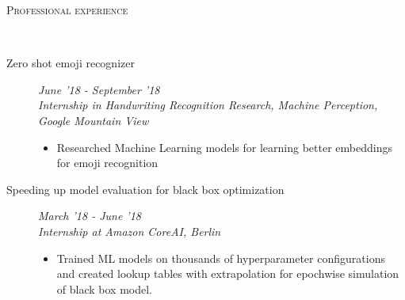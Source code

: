 \documentclass[9pt]{article}
\newenvironment{changemargin}[2]{%
  \begin{list}{}{%
      \setlength{\topsep}{0pt}%
    \setlength{\leftmargin}{#1}%
    \setlength{\rightmargin}{#2}%
    \setlength{\listparindent}{\parindent}%
  \setlength{\itemindent}{\parindent}%
    \setlength{\parsep}{\parskip}%
    }%
  \item[]}{\end{list}
    }
\newcommand{\lineover}{
  \begin{changemargin}{-0.05in}{-0.10in}
    \vspace*{-9pt}
    \hrulefill \\
    \vspace*{-2pt}
  \end{changemargin}
}
\newcommand{\header}[1]{
  \begin{changemargin}{-0.5in}{-0.5in}
    \scshape{#1}\\
        \lineover
  \end{changemargin}
}
\newenvironment{body} {
  \vspace*{-16pt}
        \begin{changemargin}{-0.6in}{-0.65in}
        }	
        {\end{changemargin}
}
\begin{document}
\header{Professional experience}
\begin{body}
  \vspace{14pt}
  
  \begin{description}
  	\item[\normalsize{Zero shot emoji recognizer}] \hfill 
  	\textit{June '18 - September '18} \\
  	\textit{Internship in Handwriting Recognition Research, Machine Perception, 
        Google Mountain View}
  \begin{itemize}
  	\item Researched Machine Learning models for learning better embeddings for emoji recognition
  \end{itemize}
  	
  \end{description}

  \begin{description}
    \item[\normalsize{Speeding up model evaluation for black box optimization}] 
      \hfill \textit{March '18 - June '18} \\
      \textit{Internship at Amazon CoreAI, Berlin}
      \begin{itemize}
        \item Trained ML models on thousands of hyperparameter configurations and created
          lookup tables with extrapolation for epochwise simulation of black box
          model.
      \end{itemize}


\end{description}
\end{body}
\end{document}
